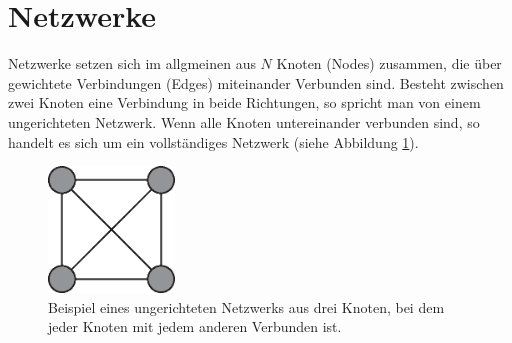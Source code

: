 
\section{Netzwerke}
Netzwerke setzen sich im allgmeinen aus $N$ Knoten (Nodes) zusammen, die über gewichtete Verbindungen (Edges) miteinander Verbunden sind. Besteht zwischen zwei Knoten eine Verbindung in beide Richtungen, so spricht man von einem ungerichteten Netzwerk. Wenn alle Knoten untereinander verbunden sind, so handelt es sich um ein vollständiges Netzwerk (siehe Abbildung \ref{fig:GraphBsp}).

\begin{figure}[t]
	 \centering
	\includegraphics[width=0.3\textwidth]{abb/misc/GraphBsp.eps}
	\caption[Ungerichteres Netzwerk]{Beispiel eines ungerichteten Netzwerks aus drei Knoten, bei dem jeder Knoten mit jedem anderen Verbunden ist.}
	\label{fig:GraphBsp}
\end{figure}

\cite{pecora2014}
\cite{sagenotebook}
\cite{nauty}
\cite{pecora1998}